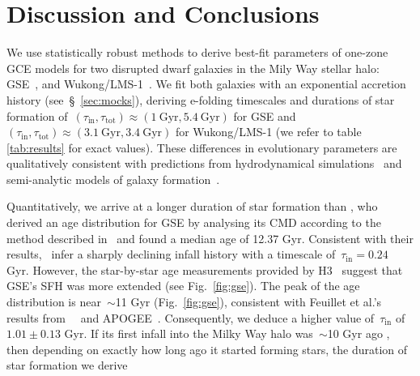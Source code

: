 \documentclass[foo.tex]{subfiles}
\begin{document}
\section{Discussion and Conclusions}
\label{sec:conclusions}

We use statistically robust methods to derive best-fit parameters of
one-zone GCE models for two disrupted dwarf galaxies in the Mily Way stellar
halo: GSE~\citep{Belokurov2018, Helmi2018}, and Wukong/LMS-1~\citep{Naidu2020,
Naidu2022, Yuan2020}.
We fit both galaxies with an exponential accretion history
(see~\S~\ref{sec:mocks}), deriving e-folding timescales and durations of star
formation of~$(\tau_\text{in}, \tau_\text{tot}) \approx (1~\text{Gyr},
5.4~\text{Gyr})$ for GSE and~$(\tau_\text{in}, \tau_\text{tot}) \approx
(3.1~\text{Gyr}, 3.4~\text{Gyr})$ for Wukong/LMS-1 (we refer to table
\ref{tab:results} for exact values).
These differences in evolutionary parameters are qualitatively consistent with
predictions from hydrodynamical simulations~\citep[e.g.,][]{GarrisonKimmel2019}
and semi-analytic models of galaxy formation~\citep[e.g.,][]{Baugh2006,
Somerville2015a, Behroozi2019}.
\par
Quantitatively, we arrive at a longer duration of star formation than
\citet{Gallart2019}, who derived an age distribution for GSE by analysing its
CMD according to the method described in~\citet{Dolphin2002} and found a
median age of 12.37 Gyr.
Consistent with their results,~\citet{Vincenzo2019} infer a sharply declining
infall history with a timescale of~$\tau_\text{in} = 0.24$ Gyr.
However, the star-by-star age measurements provided by H3~\citep{Conroy2019}
suggest that GSE's SFH was more extended (see Fig.~\ref{fig:gse}).
The peak of the age distribution is near~$\sim$11 Gyr (Fig.~\ref{fig:gse}),
consistent with Feuillet et al.'s~\citeyearpar{Feuillet2021} results
from~\gaia~\citep{Gaia2016} and APOGEE~\citep{Majewski2017}.
Consequently, we deduce a higher value of~$\tau_\text{in}$ of~$1.01 \pm 0.13$
Gyr.
If its first infall into the Milky Way halo was~$\sim$10 Gyr ago
\citep[e.g.,][]{Helmi2018, Bonaca2020}, then depending on exactly how long ago
it started forming stars, the duration of star formation we derive
\end{document}
